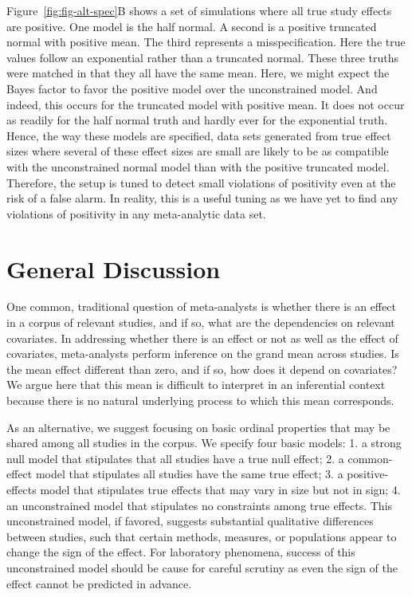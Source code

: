 \documentclass[english,man]{apa6}
\theoremstyle{definition}
\theoremstyle{definition}
\theoremstyle{definition}
\theoremstyle{remark}
\begin{document}
Figure~\ref{fig:fig-alt-spec}B shows a set of simulations where all true
study effects are positive. One model is the half normal. A second is a
positive truncated normal with positive mean. The third represents a
misspecification. Here the true values follow an exponential rather than
a truncated normal. These three truths were matched in that they all
have the same mean. Here, we might expect the Bayes factor to favor the
positive model over the unconstrained model. And indeed, this occurs for
the truncated model with positive mean. It does not occur as readily for
the half normal truth and hardly ever for the exponential truth. Hence,
the way these models are specified, data sets generated from true effect
sizes where several of these effect sizes are small are likely to be as
compatible with the unconstrained normal model than with the positive
truncated model. Therefore, the setup is tuned to detect small
violations of positivity even at the risk of a false alarm. In reality,
this is a useful tuning as we have yet to find any violations of
positivity in any meta-analytic data set.

\section{General Discussion}\label{general-discussion}

One common, traditional question of meta-analysts is whether there is an
effect in a corpus of relevant studies, and if so, what are the
dependencies on relevant covariates. In addressing whether there is an
effect or not as well as the effect of covariates, meta-analysts perform
inference on the grand mean across studies. Is the mean effect different
than zero, and if so, how does it depend on covariates? We argue here
that this mean is difficult to interpret in an inferential context
because there is no natural underlying process to which this mean
corresponds.

As an alternative, we suggest focusing on basic ordinal properties that
may be shared among all studies in the corpus. We specify four basic
models: 1. a strong null model that stipulates that all studies have a
true null effect; 2. a common-effect model that stipulates all studies
have the same true effect; 3. a positive-effects model that stipulates
true effects that may vary in size but not in sign; 4. an unconstrained
model that stipulates no constraints among true effects. This
unconstrained model, if favored, suggests substantial qualitative
differences between studies, such that certain methods, measures, or
populations appear to change the sign of the effect. For laboratory
phenomena, success of this unconstrained model should be cause for
careful scrutiny as even the sign of the effect cannot be predicted in
advance.
\end{document}
